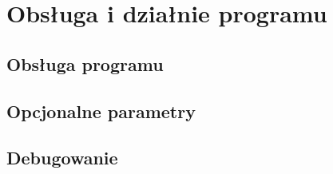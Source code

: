 \section{Obsługa i działnie programu}
\subsection{Obsługa programu}
\subsection{Opcjonalne parametry}
\subsection{Debugowanie}